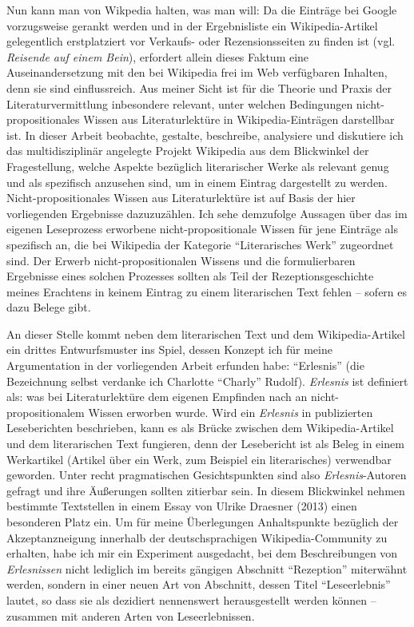 \documentclass[fontsize=12pt]{scrartcl}
\begin{document}
Nun kann man von Wikpedia halten, was man will: Da die Eintr\"age bei Google vorzugsweise gerankt werden und in der Ergebnisliste ein Wi\-ki\-pe\-dia-Artikel gelegentlich erstplatziert vor Verkaufs- oder Rezensionsseiten zu finden ist (vgl. \textit{Reisende auf einem Bein}), erfordert allein dieses Faktum eine Auseinandersetzung mit den bei Wi\-ki\-pe\-dia frei im Web verf\"ugbaren Inhalten, denn sie sind einflussreich. Aus meiner Sicht ist f\"ur die Theorie und Praxis der Li\-te\-ra\-tur\-ver\-mitt\-lung inbesondere relevant, unter welchen Bedingungen nicht-pro\-po\-si\-ti\-o\-na\-les Wissen aus Li\-te\-ra\-tur\-lekt\"ure in Wi\-ki\-pe\-dia-Eintr\"agen darstellbar ist. In dieser Arbeit beobachte, gestalte, beschreibe, ana\-lysiere und diskutiere ich das multidisziplin\"ar angelegte Projekt Wi\-ki\-pe\-dia aus dem Blickwinkel der Fragestellung, welche Aspekte bez\"uglich li\-te\-ra\-rischer Werke als relevant genug und als spezifisch anzusehen sind, um in einem Eintrag dargestellt zu werden. Nicht-pro\-po\-si\-ti\-o\-na\-les Wissen aus Li\-te\-ra\-tur\-lekt\"ure ist auf Basis der \mbox{hier} vorliegenden Ergebnisse dazuzuz\"ahlen. Ich sehe demzufolge Aussagen \"uber das im eigenen Leseprozess erworbene nicht-pro\-po\-si\-ti\-o\-na\-le Wissen f\"ur jene Eintr\"age als spezifisch an, die bei Wi\-ki\-pe\-dia der Kategorie "`Li\-te\-ra\-risches Werk"' zugeordnet sind. Der Erwerb nicht-pro\-po\-si\-ti\-o\-na\-len Wissens und die formulierbaren Ergebnisse eines solchen Prozesses sollten als Teil der Rezeptionsgeschichte meines Erachtens in keinem Eintrag zu einem li\-te\-ra\-rischen Text fehlen -- sofern es dazu Belege gibt.

An dieser Stelle kommt neben dem li\-te\-ra\-rischen Text und dem Wi\-ki\-pe\-dia-Artikel ein drittes Entwurfsmuster ins Spiel, dessen Konzept ich f\"ur meine Argumentation in der vorliegenden Arbeit erfunden habe: "`Erlesnis"' (die Be\-zeichnung \mbox{selbst} verdanke ich Charlotte "`Charly"' Rudolf). \textit{Erlesnis} ist definiert als: was bei Li\-te\-ra\-tur\-lekt\"ure dem eigenen Empfinden nach an nicht-pro\-po\-si\-ti\-o\-na\-lem Wissen erworben wurde. Wird ein \textit{Erlesnis} in pu\-bli\-zierten Leseberichten beschrieben, kann es als Br\"ucke zwischen dem Wi\-ki\-pe\-dia-Artikel und dem li\-te\-ra\-rischen Text fungieren, denn der Lesebericht ist als Beleg in einem Werkartikel (Artikel \"uber ein Werk, zum Beispiel ein li\-te\-ra\-ri\-sches) verwendbar geworden. Unter recht pragmatischen Gesichtspunkten sind also \textit{Erlesnis}-Autoren\textsuperscript{\tiny *} gefragt und ihre \"Au{\ss}erungen sollten zitierbar sein. In diesem Blickwinkel nehmen bestimmte Textstellen in einem Essay von Ulrike Draesner (2013) einen besonderen Platz ein. Um f\"ur meine \"Uberlegungen Anhaltspunkte bez\"uglich der Akzeptanzneigung innerhalb der deutschspra\-chi\-gen Wi\-ki\-pe\-dia-Community zu erhalten, habe ich mir ein Experiment ausgedacht, bei dem Beschreibungen von \textit{Erlesnissen} nicht lediglich im bereits g\"angigen Abschnitt "`Rezeption"' miterw\"ahnt werden, sondern in einer neuen Art von Abschnitt, dessen Titel "`Leseerlebnis"' lautet, so dass sie als dezidiert nennenswert he\-rausgestellt werden k\"onnen -- zusammen mit anderen Arten von Leseerlebnissen.
\end{document}
